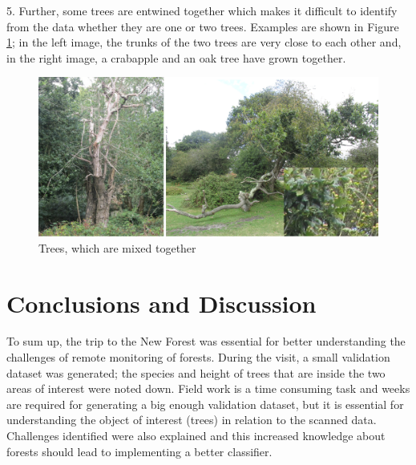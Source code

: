 \documentclass{subfiles}
\begin{document}
    \par 5.	Further, some trees are entwined together which makes it difficult to identify from the data whether they are one or two trees. Examples are shown in Figure \ref{fig:CC_MixedTrees}; in the left image, the trunks of the two trees are very close to each other and, in the right image, a crabapple and an oak tree have grown together. 
    
    \begin{figure} [!h]
    	\centering
    	\includegraphics[width=\textwidth]{img/NewForest/CC_MixedTrees}
    	\caption{Trees, which are mixed together}
    	\label{fig:CC_MixedTrees}
    \end{figure}
    
    \section{Conclusions and Discussion }
    \par To sum up, the trip to the New Forest was essential for better understanding the challenges of remote monitoring of forests. During the visit, a small validation dataset was generated; the species and height of trees that are inside the two areas of interest were noted down. Field work is a time consuming task and weeks are required for generating a big enough validation dataset, but it is essential for understanding the object of interest (trees) in relation to the scanned data. Challenges identified were also explained and this increased knowledge about forests should lead to implementing a better classifier. 
    
\end{document}
